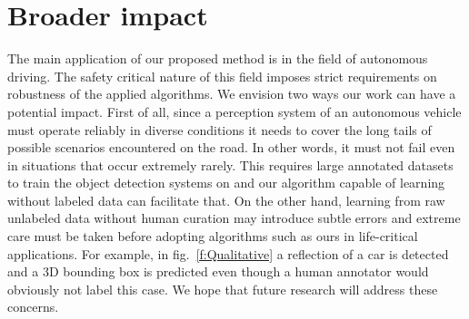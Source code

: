 \section{Broader impact}\label{s:broaderimpact}

The main application of our proposed method is in the field of autonomous driving. The safety critical nature of this field imposes strict requirements on robustness of the applied algorithms. We envision two ways our work can have a potential impact. First of all, since a perception system of an autonomous vehicle must operate reliably in diverse conditions it needs to cover the long tails of possible scenarios encountered on the road. In other words, it must not fail even in situations that occur extremely rarely. This requires large annotated datasets to train the object detection systems on and our algorithm capable of learning without labeled data can facilitate that. On the other hand, learning from raw unlabeled data without human curation may introduce subtle errors and extreme care must be taken before adopting algorithms such as ours in life-critical applications. For example, in fig.~\ref{f:Qualitative} a reflection of a car is detected and a 3D bounding box is predicted even though a human annotator would obviously not label this case. We hope that future research will address these concerns.